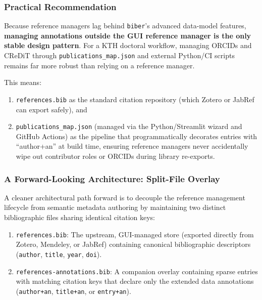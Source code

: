 \documentclass[12pt, twoside]{article}
\newcommand{\fname}[1]{\texttt{#1}}
\begin{document}
\subsubsection{Practical Recommendation}\mbox{}\par
\smallskip

Because reference managers lag behind \texttt{biber}’s advanced data-model features, \textbf{managing annotations outside the \gls{GUI} reference manager is the only stable design pattern}. For a \gls{KTH} doctoral workflow, managing \glspl{ORCID} and \gls{CReDiT} through \fname{publications\_map.json} and external Python/\gls{CI} scripts remains far more robust than relying on a reference manager.

This means:
\begin{enumerate}
    \item \fname{references.bib} as the standard citation repository (which Zotero or JabRef can export safely), and
    \item \fname{publications\_map.json} (managed via the Python/Streamlit wizard and GitHub Actions) as the pipeline that programmatically decorates entries with \enquote{author+an} at build time, ensuring reference managers never accidentally wipe out contributor roles or \glspl{ORCID} during library re-exports.
\end{enumerate}

\subsubsection{A Forward-Looking Architecture: Split-File Overlay}\mbox{}\par
\smallskip

A cleaner architectural path forward is to decouple the reference management lifecycle from semantic metadata authoring by maintaining two distinct bibliographic files sharing identical citation keys:
\begin{enumerate}
\item \fname{references.bib}: The upstream, \gls{GUI}-managed store (exported directly from Zotero, Mendeley, or JabRef) containing canonical bibliographic descriptors (\eg \texttt{author}, \texttt{title}, \texttt{year}, \texttt{doi}).

\item \fname{references-annotations.bib}: A companion overlay containing sparse entries with matching citation keys that declare only the extended data annotations (\eg \texttt{author+an}, \texttt{title+an}, or \texttt{entry+an}).
\end{enumerate}
\end{document}
